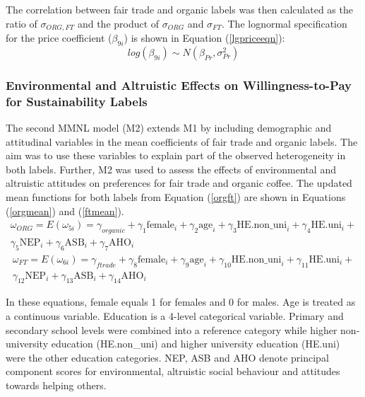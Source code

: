 \documentclass[sustainability,article,accept,moreauthors,pdftex,10pt,a4paper]{Definitions/mdpi}
\theoremstyle{mdpi}
\newcounter{ex}
\newcounter{re}
\theoremstyle{mdpidefinition}
\begin{document}
{{The correlation between fair trade and organic labels was then calculated as the ratio of $\sigma_{ORG,FT}$ and the product of $\sigma_{ORG}$ and $\sigma_{FT}$. The lognormal specification for the price coefficient ($\beta_{9i}$) is shown in Equation (\ref{lgpriceeqn}):
\begin{equation}\label{lgpriceeqn}
log(\beta_{9i})\sim N(\beta_{Pr},\sigma^2_{Pr})
\end{equation}
}
\subsubsection{Environmental and Altruistic Effects on Willingness-to-Pay for Sustainability Labels}
\par{The second MMNL model (M2) extends M1 by including demographic and attitudinal variables in the mean coefficients of fair trade and organic labels. The aim was to use these variables to explain part of the observed heterogeneity in both labels. Further, M2 was used to assess the effects of environmental and altruistic attitudes on preferences for fair trade and organic coffee. The updated mean functions for both labels from Equation (\ref{orgft}) are shown in Equations (\ref{orgmean}) and (\ref{ftmean}).
\begin{multline}\label{orgmean}
\omega_{ORG}=E(\omega_{5i})= \gamma_{organic}+\gamma_{1}\mbox{female}_i+\gamma_{2}\mbox{age}_i+ \gamma_{3}\mbox{HE.non\_uni}_i+ \gamma_{4}\mbox{HE.uni}_i+ \\ \gamma_{5}\mbox{NEP}_i + \gamma_{6}\mbox{ASB}_i+\gamma_{7}\mbox{AHO}_i
\end{multline}
\vspace{-10mm}
\begin{multline}\label{ftmean}
\omega_{FT}=E(\omega_{6i})= \gamma_{ftrade}+\gamma_{8}\mbox{female}_i+\gamma_{9}\mbox{age}_i+ \gamma_{10}\mbox{HE.non\_uni}_i+ \gamma_{11}\mbox{HE.uni}_i+ \\
\gamma_{12}\mbox{NEP}_i+\gamma_{13}\mbox{ASB}_i+\gamma_{14}\mbox{AHO}_i
\end{multline}
\vspace{3mm}
}
\par{In these equations, female equals 1 for females and 0 for males. Age is treated as a continuous variable. Education is a 4-level categorical variable. Primary and secondary school levels were combined into a reference category while higher non-university education (HE.non\_uni) and higher university education (HE.uni) were the other education categories. NEP, ASB and AHO denote principal component scores for environmental, altruistic social behaviour and attitudes towards helping others. \iffalse To ensure $\gamma_{ftrade}$ and $\gamma_{organic}$ represented the overall mean WTP for fair trade and organic labels, we standardized the age attribute and effect coded the education attribute. Thus, HE.non\_uni is 1 for higher non-university education, 0 for higher university education and $-$1 for either primary or secondary education. Similarly, HE.uni is 1 for higher university, 0 for higher non-university and $-$1 for either primary or secondary education. \fi }

}
\end{document}
